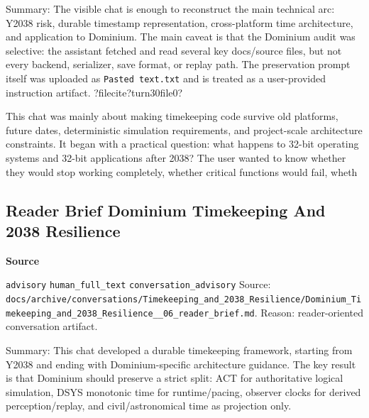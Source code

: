 \documentclass[9pt,a4paper,openany]{book}
\newcommand{\vonecallout}[3]{\par\medskip\noindent\begingroup\setlength{\fboxsep}{7pt}\colorbox{DomCalloutBg}{\parbox{0.94\linewidth}{\textbf{\textcolor{#1}{#2}}\par #3}}\endgroup\par\medskip}
\begin{document}
Summary: The visible chat is enough to reconstruct the main technical arc: Y2038 risk, durable timestamp representation, cross-\allowbreak{}platform time architecture, and application to Dominium.\allowbreak{} The main caveat is that the Dominium audit was selective: the assistant fetched and read several key docs/\allowbreak{}source files, but not every backend, serializer, save format, or replay path.\allowbreak{} The preservation prompt itself was uploaded as \texttt{Pasted text.\allowbreak{}txt} and is treated as a user-\allowbreak{}provided instruction artifact.\allowbreak{} ?filecite?turn30file0?


This chat was mainly about making timekeeping code survive old platforms, future dates, deterministic simulation requirements, and project-\allowbreak{}scale architecture constraints.\allowbreak{} It began with a practical question: what happens to 32-\allowbreak{}bit operating systems and 32-\allowbreak{}bit applications after 2038? The user wanted to know whether they would stop working completely, whether critical functions would fail, wheth



\subsection{Reader Brief Dominium Timekeeping And 2038 Resilience}

\vonecallout{DomSlate}{Source}{\texttt{advisory} \texttt{human\_\allowbreak{}full\_\allowbreak{}text} \texttt{conversation\_\allowbreak{}advisory} Source: \texttt{docs/\allowbreak{}archive/\allowbreak{}conversations/\allowbreak{}Timekeeping\_\allowbreak{}and\_\allowbreak{}2038\_\allowbreak{}Resilience/\allowbreak{}Dominium\_\allowbreak{}Timekeeping\_\allowbreak{}and\_\allowbreak{}2038\_\allowbreak{}Resilience\_\allowbreak{}\_\allowbreak{}06\_\allowbreak{}reader\_\allowbreak{}brief.\allowbreak{}md}.\allowbreak{} Reason: reader-\allowbreak{}oriented conversation artifact.\allowbreak{}}

Summary: This chat developed a durable timekeeping framework, starting from Y2038 and ending with Dominium-\allowbreak{}specific architecture guidance.\allowbreak{} The key result is that Dominium should preserve a strict split: ACT for authoritative logical simulation, DSYS monotonic time for runtime/\allowbreak{}pacing, observer clocks for derived perception/\allowbreak{}replay, and civil/\allowbreak{}astronomical time as projection only.\allowbreak{}
\end{document}
